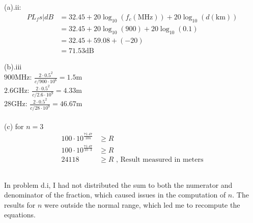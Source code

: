\documentclass[]{article}
\begin{document}
\subsection{}
(a).ii:
\begin{align*}
	PL_fs|dB &= 32.45 + 20 \log_{10}(f_c(\text{MHz})) + 20 \log_{10}(d(\text{km})) \\
	&= 32.45 + 20 \log_{10}(900) + 20 \log_{10}(0.1) \\
	&= 32.45 + 59.08 + (-20) \\
	&= 71.53 \text{dB}
\end{align*}

(b).iii\\
$900$MHz: $\frac{2 \cdot 0.5^2}{c/900 \cdot 10^{6}} = 1.5$m\\
$2.6$GHz: $\frac{2 \cdot 0.5^2}{c/2.6 \cdot 10^{9}} = 4.33$m\\
$28$GHz: $\frac{2 \cdot 0.5^2}{c/28 \cdot 10^{9}} = 46.67$m\\\\

(c) for $n=3$
\begin{align*}
	100 \cdot 10^{\frac{71.47}{10n}} &\geq R\\
	100 \cdot 10^{\frac{71.47}{10 \cdot 3}} &\geq R\\
	24118 &\geq R \text{  ,  Result measured in meters}
\end{align*}

\subsection{}
In problem d.i, I had not distributed the sum to both the numerator and denominator of the fraction, which caused issues in the computation of $n$. The results for $n$ were outside the normal range, which led me to recompute the equations.
\end{document}

